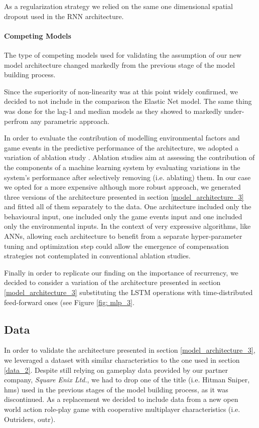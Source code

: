 As a regularization strategy we relied on the same one dimensional spatial dropout used in the RNN architecture.

\paragraph*{Competing Models}
\label{competing_models_3}
The type of competing models used for validating the assumption of our new model architecture changed markedly from the previous stage of the model building process. 

Since the superiority of non-linearity was at this point widely confirmed, we decided to not include in the comparison the Elastic Net model. The same thing was done for the lag-1 and median models as they showed to markedly under-perfrom any parametric approach. 

In order to evaluate the contribution of modelling environmental factors and game events in the predictive performance of the architecture, we adopted a variation of ablation study \cite{meyes2019ablation}. Ablation studies aim at assessing the contribution of the components of a machine learning system by evaluating variations in the system's performance after selectively removing (i.e. ablating) them. In our case we opted for a more expensive although more robust approach, we generated three versions of the architecture presented in section \ref{model_architecture_3} and fitted all of them separately to the data. One architecture included only the behavioural input, one included only the game events input and one included only the environmental inputs. In the context of very expressive algorithms, like ANNs, allowing each architecture to benefit from a separate hyper-parameter tuning and optimization step could allow the emergence of compensation strategies not contemplated in conventional ablation studies. 

Finally in order to replicate our finding on the importance of recurrency, we decided to consider a variation of the architecture presented in section \ref{model_architecture_3} substituting the LSTM operations with time-distributed feed-forward ones (see Figure \ref{fig: mlp_3}.


\subsection{Data}
\label{data_3}
In order to validate the architecture presented in section \ref{model_architecture_3}, we leveraged a dataset with similar characteristics to the one used in section \ref{data_2}. Despite still relying on gameplay data provided by our partner company, \textit{Square Enix Ltd.}, we had to drop one of the title (i.e. Hitman Sniper, hms) used in the previous stages of the model building process, as it was discontinued. As a replacement we decided to include data from a new open world action role-play game with cooperative multiplayer characteristics (i.e. Outriders, outr). 

